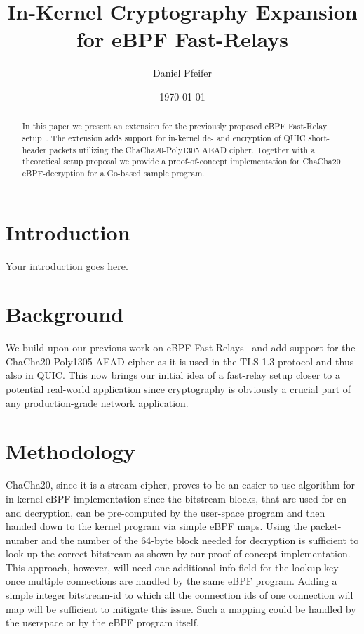 \documentclass[a4paper,12pt]{article}
\title{In-Kernel Cryptography Expansion \\ for eBPF Fast-Relays}
\author{Daniel Pfeifer}
\date{\today}
\begin{document}
\maketitle

\begin{abstract}
In this paper we present an extension for the previously proposed eBPF Fast-Relay setup~\parencite{fast-relays-thesis-repo}. 
The extension adds support for in-kernel de- and encryption of QUIC short-header packets utilizing the ChaCha20-Poly1305 AEAD cipher.
Together with a theoretical setup proposal we provide a proof-of-concept implementation for ChaCha20 eBPF-decryption for a Go-based 
sample program.
\end{abstract}


\section{Introduction}
Your introduction goes here.

\section{Background}
We build upon our previous work on eBPF Fast-Relays~\parencite{fast-relays-thesis-repo} and add support for the 
ChaCha20-Poly1305 AEAD cipher as it is used in the TLS 1.3 protocol and thus also in QUIC\@.
This now brings our initial idea of a fast-relay setup closer to a potential real-world application since 
cryptography is obviously a crucial part of any production-grade network application. 

\section{Methodology}
ChaCha20, since it is a stream cipher, proves to be an easier-to-use algorithm for in-kernel eBPF implementation since 
the bitstream blocks, that are used for en- and decryption, can be pre-computed by the user-space program and then handed 
down to the kernel program via simple eBPF maps.
Using the packet-number and the number of the 64-byte block needed for decryption is sufficient to look-up the correct bitstream 
as shown by our proof-of-concept implementation.
This approach, however, will need one additional info-field for the lookup-key once multiple connections are handled by the same
eBPF program.
Adding a simple integer bitstream-id to which all the connection ids of one connection will map will be sufficient to mitigate this issue.
Such a mapping could be handled by the userspace or by the eBPF program itself. 
\end{document}
